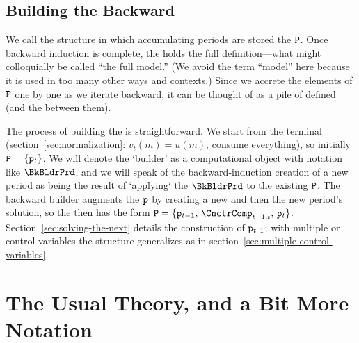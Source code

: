 \documentclass[titlepage, headings=optiontotocandhead]{econark}
\begin{document}

\hypertarget{building-pile}{}
\subsection{Building the {\PileName} Backward}\label{subsec:building-pile}

We call the structure in which accumulating periods are stored the {\pileName} $\mathtt{P}$. Once backward induction is complete, the {\pileName} holds the full definition---what might colloquially be called ``the full model.''  (We avoid the term ``model'' here because it is used in too many other ways and contexts.)  Since we accrete the elements of $\mathtt{P}$ one by one as we iterate backward, it can be thought of as a pile of defined {\intervals} (and the {\Cncts} between them).

The process of building the {\pileName} is straightforward.  We start from the terminal {\interval} (section~\ref{sec:normalization}: $v_{t}(m) = u(m)$, consume everything), so initially $\mathtt{P} = \{\mathtt{p}_{t}\}$.  We will denote the `builder' as a computational object with notation like $\BkBldrPrd$, and we will speak of the backward-induction creation of a new period as being the result of `applying` the $\BkBldrPrd$ to the existing $\mathtt{P}$.  The backward builder augments the $\mathtt{p}$ by creating a new {\Cnct} and then the new period's solution, so the {\pileName} then has the form $\Pile = \{\pile_{t-1},\, \CnctrComp_{t-1,t},\, \pile_{t}\}$.  Section~\ref{sec:solving-the-next} details the construction of $\mathtt{p}_{t\!-\!1}$; with multiple {\stgs} or control variables the structure generalizes as in section~\ref{sec:multiple-control-variables}.



\hypertarget{the-usual-theory}{}
\section{The Usual Theory, and a Bit More Notation}\label{sec:the-usual-theory}
\end{document}
